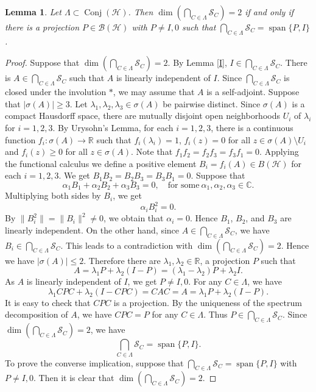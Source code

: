 \documentclass[11pt]{amsart}
\newtheorem{lemma}[theorem]{Lemma}
\theoremstyle{remark}
\newcommand{\BH}{\mathcal{B(H)}}
\newcommand{\cH}{{\mathcal{H}}}
\newcommand{\SC}{\mathcal{S}_C}
\newcommand{\Conj}{\operatorname{Conj}(\cH)}
\newcommand{\Span}{\operatorname{span}}
\begin{document}
\begin{lemma}\label{dim2t}
Let $\Lambda \subset \Conj$. Then  $\dim (\bigcap_{C \in \Lambda} \SC)=2$  if and only if 
there is a projection $P \in \BH$ with $P \neq I, 0$ such that %
$\bigcap_{C \in \Lambda} \SC=\Span \{P, I\}$.
\end{lemma}
\begin{proof}
Suppose that $\dim (\bigcap_{C \in \Lambda} \SC)=2$. By Lemma \ref{I}, $I \in \bigcap_{C \in \Lambda} \SC$. There is $A \in \bigcap_{C \in \Lambda} \SC$ such that $A$ is linearly independent of $I$. Since $\bigcap_{C \in \Lambda} \SC$ is closed under the involution $*$, we may assume that $A$ is a self-adjoint.
Suppose that $|\sigma(A)| \ge 3$. Let $\lambda_1, \lambda_2, \lambda_3 \in \sigma(A)$ be pairwise distinct. Since $\sigma(A)$ is a compact Hausdorff space, there are mutually disjoint open neighborhoods $U_i$ of $\lambda_i$ for $i=1,2,3$. By Urysohn's Lemma, for each $i=1,2,3$, there is a continuous function $f_i : \sigma(A) \to \mathbb{R}$ such that $f_i(\lambda_i)=1$,  $f_i(z)=0$ for all $z \in \sigma(A) \setminus U_i$ and $f_i(z) \ge 0$ for all $z \in \sigma(A)$. Note that $f_1f_2=f_2f_3=f_3f_1=0$. Applying the functional calculus we define a positive element $B_i=f_i(A) \in B(\cH)$ for each $i=1,2,3$. We get $B_1B_2=B_2B_3=B_3B_1=0$.  Suppose that 
\[
\alpha_1 B_1+ \alpha_2B_2+\alpha_3 B_3=0, \quad \text{for some} \ \alpha_1, \alpha_2, \alpha_3 \in \mathbb{C}.
\]
Multiplying both sides by $B_i$, we get 
\[
\alpha_iB_i^2=0.
\] 
By $\|B_i^2\|=\|B_i\|^2 \neq 0$, we obtain that $\alpha_i=0$. Hence $B_1$, $B_2$, and $B_3$ are linearly independent. On the other hand,  since $A \in \bigcap_{C \in \Lambda} \SC$,  we have $B_i \in \bigcap_{C \in \Lambda} \SC$.  This leads to a contradiction with $\dim (\bigcap_{C \in \Lambda} \SC)=2 $. Hence we have $|\sigma(A)| \le 2$. Therefore there are $\lambda_1, \lambda_2 \in \mathbb{R}$, a projection $P$ such that 
\begin{equation*}\label{SA}
A=\lambda_1 P+ \lambda_2(I-P)=(\lambda_1-\lambda_2)P+ \lambda_2I.
\end{equation*}
As $A$ is linearly independent of $I$, we get $P \neq I, 0$.  For any $C \in \Lambda$, we have
\[
\lambda_1 CPC+ \lambda_2(I-CPC)=CAC=A=\lambda_1 P+ \lambda_2(I-P).
\]
It is easy to check that $CPC$ is a projection. By the uniqueness of the spectrum decomposition of $A$, we have $CPC=P$ for any $C \in \Lambda$. Thus $P \in \bigcap_{C \in \Lambda} \SC$. %
Since $\dim(\bigcap_{C \in \Lambda} \SC)=2$, we have 
\[
\bigcap_{C \in \Lambda} \SC=\Span \{P, I\}.
\]
To prove the converse implication, suppose that $\bigcap_{C \in \Lambda} \SC=\Span \{P, I\}$ with $P \neq I, 0$. Then  it is clear that  $\dim (\bigcap_{C \in \Lambda} \SC)=2$.
\end{proof}
\end{document}
